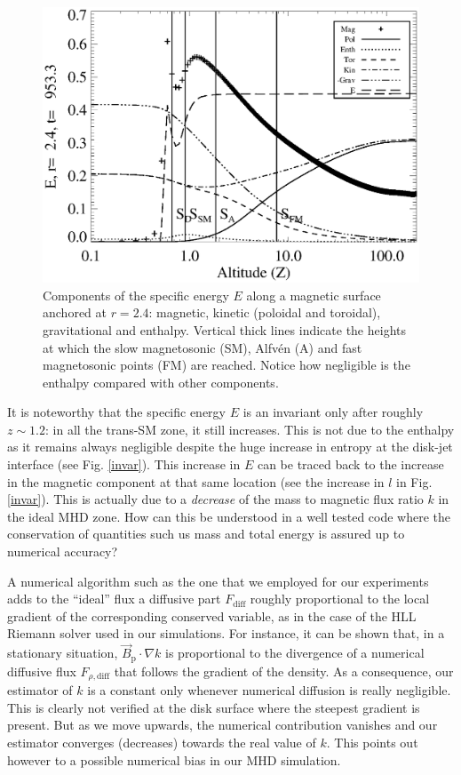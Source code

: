 \documentclass{aa}
\begin{document}
\begin{figure}
   \centering \includegraphics[width=\columnwidth]{12633f10.eps}
   \caption{Components of the specific energy $E$ along a magnetic surface anchored at $r=2.4$: magnetic, kinetic (poloidal and toroidal), gravitational and enthalpy. Vertical thick lines indicate the
heights at which the slow magnetosonic (SM), Alfv\'en (A) and fast magnetosonic points (FM) are reached. Notice how negligible is the enthalpy compared with other components.  }
\label{bernoulli}%
    \end{figure}

 It is noteworthy that the specific energy $E$ is an invariant only after roughly $z\sim 1.2$: in all the trans-SM zone, it still increases. This is not due to the enthalpy as it remains always
 negligible despite the huge increase in entropy at the disk-jet interface (see Fig. \ref{invar}). This increase in $E$ can be traced back to the increase in the magnetic component at that same
 location (see the increase in $l$ in Fig. \ref{invar}). This is actually due to a {\em decrease} of the mass to magnetic flux ratio $k$ in the ideal MHD zone. How can this be understood in a well
 tested code where the conservation of quantities such us mass and total energy is assured up to numerical accuracy?

A numerical algorithm such as the one that we employed for our experiments adds to the ``ideal'' flux a diffusive part $F_\mathrm{diff}$ roughly proportional to the local gradient of the corresponding
conserved variable, as in the case of the HLL Riemann solver used in our simulations. For instance, it can be shown that, in a stationary situation, $\vec B_\mathrm{p} \cdot \nabla k$ is proportional to the
divergence of a numerical diffusive flux $F_{\rho, \mathrm{diff}}$ that follows the gradient of the density. As a consequence, our estimator of $k$ is a constant only whenever numerical diffusion is
really negligible.  This is clearly not verified at the disk surface where the steepest gradient is present. But as we move upwards, the numerical contribution vanishes and our estimator converges
(decreases) towards the real value of $k$. This points out however to a possible numerical bias in our MHD simulation.
\end{document}
